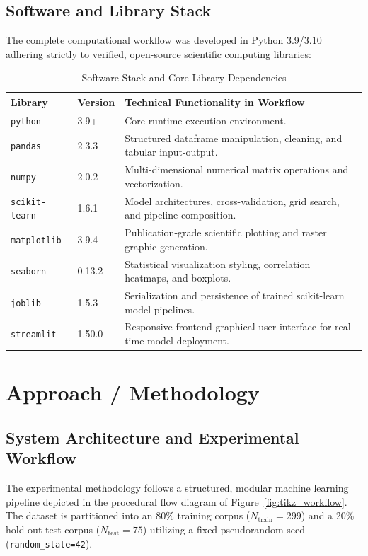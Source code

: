 \documentclass[12pt,a4paper]{article}
\begin{document}
\subsection{Software and Library Stack}
The complete computational workflow was developed in Python 3.9/3.10 adhering strictly to verified, open-source scientific computing libraries:
\begin{table}[htbp]
\centering
\small
\caption{Software Stack and Core Library Dependencies}
\label{tab:software_stack}
\begin{tabular}{lll}
\toprule
\textbf{Library} & \textbf{Version} & \textbf{Technical Functionality in Workflow} \\
\midrule
\texttt{python} & 3.9+ & Core runtime execution environment. \\
\texttt{pandas} & 2.3.3 & Structured dataframe manipulation, cleaning, and tabular input-output. \\
\texttt{numpy} & 2.0.2 & Multi-dimensional numerical matrix operations and vectorization. \\
\texttt{scikit-learn} & 1.6.1 & Model architectures, cross-validation, grid search, and pipeline composition. \\
\texttt{matplotlib} & 3.9.4 & Publication-grade scientific plotting and raster graphic generation. \\
\texttt{seaborn} & 0.13.2 & Statistical visualization styling, correlation heatmaps, and boxplots. \\
\texttt{joblib} & 1.5.3 & Serialization and persistence of trained scikit-learn model pipelines. \\
\texttt{streamlit} & 1.50.0 & Responsive frontend graphical user interface for real-time model deployment. \\
\bottomrule
\end{tabular}
\end{table}

\section{Approach / Methodology}

\subsection{System Architecture and Experimental Workflow}
The experimental methodology follows a structured, modular machine learning pipeline depicted in the procedural flow diagram of Figure~\ref{fig:tikz_workflow}. The dataset is partitioned into an 80\% training corpus ($N_{\text{train}} = 299$) and a 20\% hold-out test corpus ($N_{\text{test}} = 75$) utilizing a fixed pseudorandom seed (\texttt{random\_state=42}). 
\end{document}
